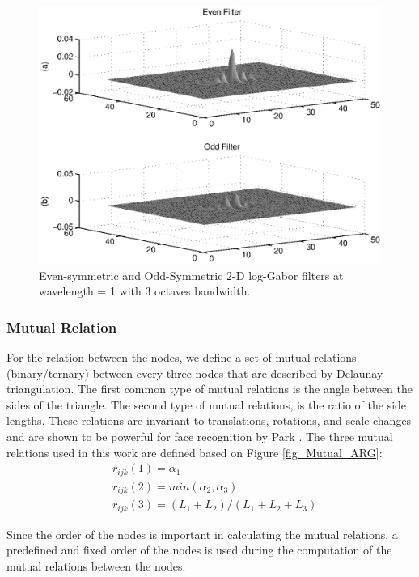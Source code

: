 \begin{figure}[tbp]
\begin{center}
\includegraphics[scale = .8]{./chapters/figures/2D_log_Gabor.eps}
\caption{Even-symmetric and Odd-Symmetric 2-D log-Gabor filters at
wavelength = 1 with 3 octaves bandwidth.}\label{fig_2D_logGabor}
\end{center}
\end{figure}

\subsubsection{Mutual Relation} For the relation between the nodes,
we define a set of mutual relations (binary/ternary) between every
three nodes that are described by Delaunay triangulation. The first
common type of mutual relations is the angle between the sides of
the triangle. The second type of mutual relations, is the ratio of
the side lengths. These relations are invariant to translations,
rotations, and scale changes \cite{Li92} and are shown to be
powerful for face recognition by Park \etal \cite{park_05}. The
three mutual relations used in this work are defined based on Figure
\ref{fig_Mutual_ARG}:
\begin{eqnarray} &
r_{ijk}(1)=\alpha_1 \nonumber\\& r_{ijk}(2)=min(\alpha_2,\alpha_3) \nonumber\\
& r_{ijk}(3)= (L_1 +  L_2) / (L_1 + L_2 + L_3)
\end{eqnarray}

Since the order of the nodes is important in calculating the mutual
relations, a predefined and fixed order of the nodes is used during
the computation of the mutual relations between the nodes.

